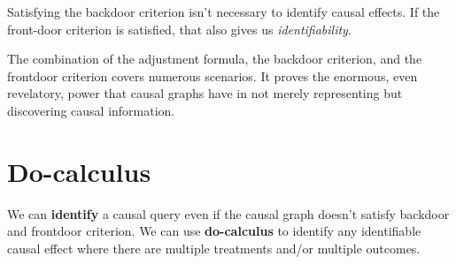 Satisfying the backdoor criterion isn't necessary to identify causal effects. If
the front-door criterion is satisfied, that also gives us \textit{identifiability}.

The combination of the adjustment formula, the backdoor criterion, and the frontdoor
criterion covers numerous scenarios. It proves the enormous, even revelatory, power
that causal graphs have in not merely representing but discovering causal
information.
\section{Do-calculus}
We can \textbf{identify} a causal query even if the causal graph doesn't satisfy
backdoor and frontdoor criterion. We can use \textbf{do-calculus} to
identify any identifiable causal effect where there are multiple treatments and/or
multiple outcomes.

